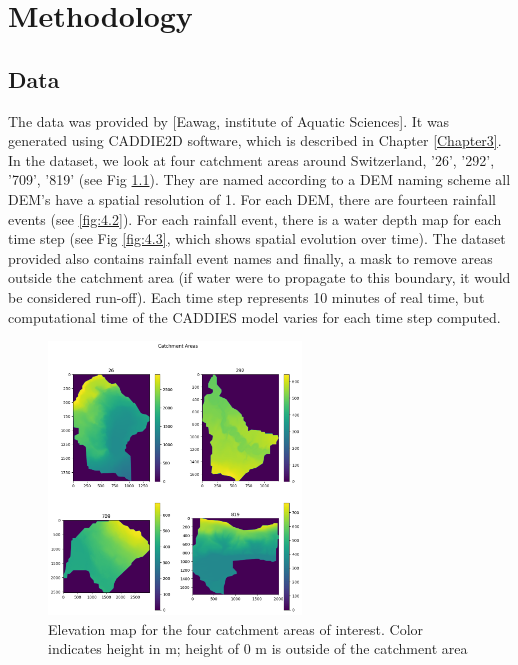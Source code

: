
\chapter{Methodology} %
\label{Chapter4} %

\section{Data}

The data was provided by [Eawag, institute of Aquatic Sciences]. It was generated using CADDIE2D software, which is described in Chapter \ref{Chapter3}. In the dataset, we look at four catchment areas around Switzerland, '26', '292', '709', '819' (see Fig \ref{fig:4.1}). They are named according to a DEM naming scheme all DEM's have a spatial resolution of 1. For each DEM, there are fourteen rainfall events (see \ref{fig:4.2}). For each rainfall event, there is a water depth  map for each time step (see Fig \ref{fig:4.3}, which shows spatial evolution over time). The dataset provided also contains rainfall event names and  finally, a mask to remove areas outside the catchment area (if water were to propagate to this boundary, it would be considered run-off). Each time step represents 10 minutes of real time, but computational time of the CADDIES model varies for each time step computed.

\begin{figure}[htbp]
	\includegraphics[width=0.6\textwidth]{../Figures/Catchment_dems.png}
	\centering
	\caption[FourDems]{Elevation map for the four catchment areas of interest. Color indicates height in m; height of 0 m is outside of the catchment area} 
	\label{fig:4.1}
\end{figure}

